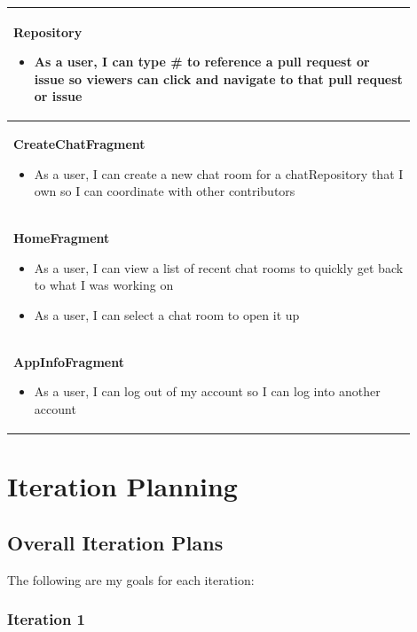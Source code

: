 \documentclass{report}
\begin{document}
\begin{center}
\begin{tabular}{ | p{0.9\linewidth} |}
    \hline
    \textbf{Repository} \begin{itemize}
                            \item As a user, I can type \# to reference a pull request or issue so viewers can click and navigate to that pull request or issue
                        \end{itemize} \\
    \hline
    \textbf{CreateChatFragment} \begin{itemize}
                                    \item As a user, I can create a new chat room for a chatRepository that I own so I can coordinate with other contributors
                                \end{itemize}       \\
    \hline
    \textbf{HomeFragment} \begin{itemize}
                              \item As a user, I can view a list of recent chat rooms to quickly get back to what I was working on
                              \item As a user, I can select a chat room to open it up
                          \end{itemize}                              \\
    \hline
    \textbf{AppInfoFragment} \begin{itemize}
            \item As a user, I can log out of my account so I can log into another account
    \end{itemize} \\
    \hline
    \end{tabular}
\end{center}
\newpage

\chapter{Iteration Planning}

\section{Overall Iteration Plans}

The following are my goals for each iteration:

\subsection{Iteration 1}
\end{document}

